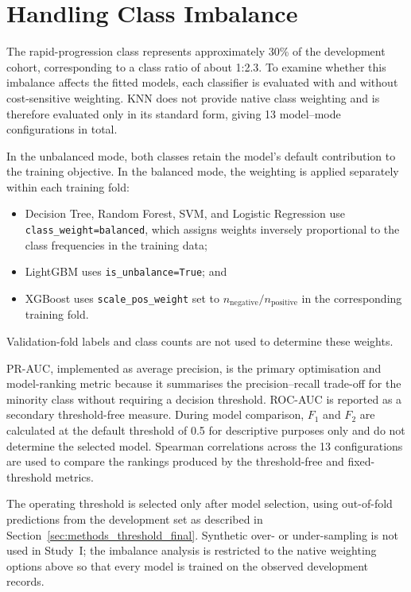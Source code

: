 \section{Handling Class Imbalance}
\label{sec:methods_imbalance}
The rapid-progression class represents approximately 30\% of the development cohort, corresponding to a class ratio of about 1:2.3. To examine whether this imbalance affects the fitted models, each classifier is evaluated with and without cost-sensitive weighting. \gls{KNN} does not provide native class weighting and is therefore evaluated only in its standard form, giving 13 model--mode configurations in total.

In the unbalanced mode, both classes retain the model's default contribution to the training objective. In the balanced mode, the weighting is applied separately within each training fold:
\begin{itemize}
  \item Decision Tree, Random Forest, \gls{SVM}, and Logistic Regression use \texttt{class\_weight=balanced}, which assigns weights inversely proportional to the class frequencies in the training data;
  \item LightGBM uses \texttt{is\_unbalance=True}; and
  \item XGBoost uses \texttt{scale\_pos\_weight} set to $n_{\mathrm{negative}}/n_{\mathrm{positive}}$ in the corresponding training fold.
\end{itemize}
Validation-fold labels and class counts are not used to determine these weights.

\gls{PR-AUC}, implemented as average precision, is the primary optimisation and model-ranking metric because it summarises the precision--recall trade-off for the minority class without requiring a decision threshold. \gls{ROC-AUC} is reported as a secondary threshold-free measure. During model comparison, $F_1$ and $F_2$ are calculated at the default threshold of 0.5 for descriptive purposes only and do not determine the selected model. Spearman correlations across the 13 configurations are used to compare the rankings produced by the threshold-free and fixed-threshold metrics.

The operating threshold is selected only after model selection, using out-of-fold predictions from the development set as described in Section~\ref{sec:methods_threshold_final}. Synthetic over- or under-sampling is not used in Study~I; the imbalance analysis is restricted to the native weighting options above so that every model is trained on the observed development records.

